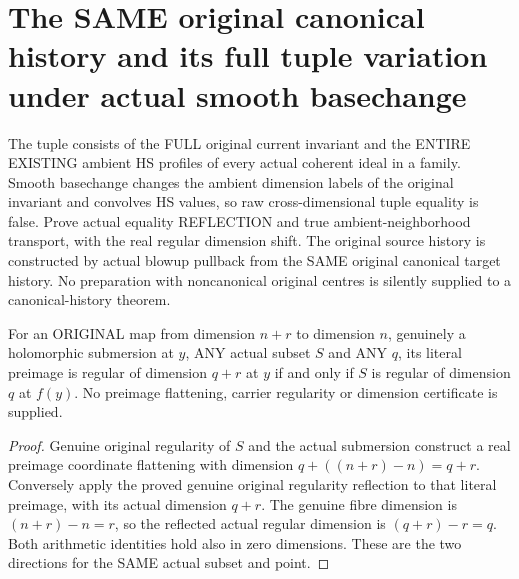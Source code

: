 \section{The SAME original canonical history and its full tuple variation under actual smooth basechange}

The tuple consists of the FULL original current invariant and the ENTIRE
EXISTING ambient HS profiles of every actual coherent ideal in a family.
Smooth basechange changes the ambient dimension labels of the original
invariant and convolves HS values, so raw cross-dimensional tuple equality
is false. Prove actual equality REFLECTION and true ambient-neighborhood
transport, with the real regular dimension shift. The original source
history is constructed by actual blowup pullback from the SAME original
canonical target history. No preparation with noncanonical original
centres is silently supplied to a canonical-history theorem.

\begin{lemma}
\label{hir:actual-smooth-basechange-whole-carrier-regularity-iff}
\leanok
For an ORIGINAL map from dimension $n+r$ to dimension $n$, genuinely a
holomorphic submersion at $y$, ANY actual subset $S$ and ANY $q$, its
literal preimage is regular of dimension $q+r$ at $y$ if and only if $S$
is regular of dimension $q$ at $f(y)$. No preimage flattening, carrier
regularity or dimension certificate is supplied.
\end{lemma}
\begin{proof}
Genuine original regularity of $S$ and the actual submersion construct a
real preimage coordinate flattening with dimension $q+((n+r)-n)=q+r$.
Conversely apply the proved genuine original regularity reflection to
that literal preimage, with its actual dimension $q+r$. The genuine
fibre dimension is $(n+r)-n=r$, so the reflected actual regular dimension
is $(q+r)-r=q$. Both arithmetic identities hold also in zero dimensions.
These are the two directions for the SAME actual subset and point.
\end{proof}

